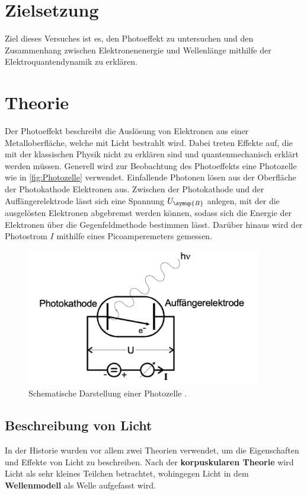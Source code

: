 \section{Zielsetzung}
Ziel dieses Versuches ist es, den Photoeffekt zu untersuchen und den Zusammenhang zwischen 
Elektronenenergie und Wellenlänge mithilfe der Elektroquantendynamik zu erklären.

\section{Theorie}
\label{sec:Theorie}
Der Photoeffekt beschreibt die Auslösung von Elektronen aus einer Metalloberfläche, welche mit Licht
bestrahlt wird. Dabei treten Effekte auf, die mit der klassischen Physik nicht zu erklären sind und quantenmechanisch
erklärt werden müssen.
Generell wird zur Beobachtung des Photoeffekts eine Photozelle wie in \autoref{fig:Photozelle} verwendet. Einfallende Photonen
lösen aus der Oberfläche der Photokathode Elektronen aus. Zwischen der Photokathode und der Auffängerelektrode lässt sich eine
Spannung $U_{\symup{B}}$ anlegen, mit der die ausgelösten Elektronen abgebremst werden können, sodass sich die Energie der Elektronen
über die Gegenfeldmethode bestimmen lässt. Darüber hinaus wird der Photostrom $I$ mithilfe eines Picoamperemeters gemessen.
\begin{figure}[H]
    \centering
    \includegraphics[height=6cm]{content/pics/Photozelle.pdf}
    \caption{Schematische Darstellung einer Photozelle \cite{v500}.}
    \label{fig:Photozelle}
\end{figure}

\subsection{Beschreibung von Licht}
In der Historie wurden vor allem zwei Theorien verwendet, um die Eigenschaften und Effekte von Licht zu beschreiben. Nach der 
\textbf{korpuskularen Theorie} wird Licht als sehr kleines Teilchen betrachtet, wohingegen Licht in dem \textbf{Wellenmodell}
als Welle aufgefasst wird.

